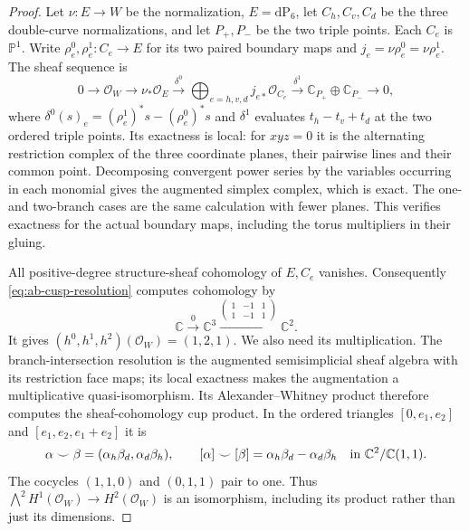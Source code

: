 \begin{proof}
Let $\nu:E\to W$ be the normalization, $E=\mathrm{dP}_6$, let
$C_h,C_v,C_d$ be the three double-curve normalizations, and let
$P_+,P_-$ be the two triple points. Each $C_e$ is $\mathbb P^1$.
Write $\rho_e^0,\rho_e^1:C_e\to E$ for its two paired boundary maps
and $j_e=\nu\rho_e^0=\nu\rho_e^1$. The sheaf sequence is
\begin{equation}\label{eq:ab-cusp-resolution}
 0\longrightarrow\mathcal O_W\longrightarrow\nu_*\mathcal O_E
 \xrightarrow{\delta^0}\bigoplus_{e=h,v,d}j_{e*}\mathcal O_{C_e}
 \xrightarrow{\delta^1}\mathbb C_{P_+}\oplus\mathbb C_{P_-}
 \longrightarrow0,
\end{equation}
where $\delta^0(s)_e=(\rho_e^1)^*s-(\rho_e^0)^*s$ and
$\delta^1$ evaluates $t_h-t_v+t_d$ at the two ordered triple points.
Its exactness is local: for $xyz=0$ it is the alternating restriction
complex of the three coordinate planes, their pairwise lines and their
common point. Decomposing convergent power series by the variables
occurring in each monomial gives the augmented simplex complex, which
is exact. The one- and two-branch cases are the same calculation with
fewer planes. This verifies exactness for the actual boundary maps,
including the torus multipliers in their gluing.

All positive-degree structure-sheaf cohomology of $E,C_e$ vanishes.
Consequently \eqref{eq:ab-cusp-resolution} computes cohomology by
\[
 \mathbb C\xrightarrow{0}\mathbb C^3
 \xrightarrow{\left(\begin{smallmatrix}1&-1&1\\1&-1&1\end{smallmatrix}\right)}
 \mathbb C^2.
\]
It gives $(h^0,h^1,h^2)(\mathcal O_W)=(1,2,1)$.
We also need its multiplication. The branch-intersection resolution
is the augmented semisimplicial sheaf algebra with its restriction face
maps; its local exactness makes the augmentation a multiplicative
quasi-isomorphism. Its Alexander--Whitney product therefore computes
the sheaf-cohomology cup product. In the ordered triangles
$[0,e_1,e_2]$ and $[e_1,e_2,e_1+e_2]$ it is
\[
 \alpha\smile\beta=(\alpha_h\beta_d,\alpha_d\beta_h),
 \qquad [\alpha]\smile[\beta]
 =\alpha_h\beta_d-\alpha_d\beta_h
 \quad\hbox{in }\mathbb C^2/\mathbb C(1,1).
\]
The cocycles $(1,1,0)$ and $(0,1,1)$ pair to one. Thus
$\bigwedge^2H^1(\mathcal O_W)\to H^2(\mathcal O_W)$ is an
isomorphism, including its product rather than just its dimensions.


\end{proof}
